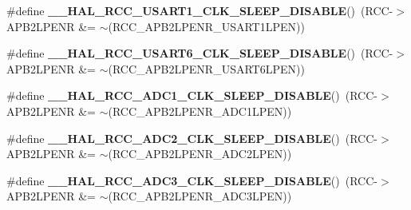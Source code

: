 \begin{DoxyCompactItemize}
\item 
\mbox{\label{group___r_c_c_ex___peripheral___clock___sleep___enable___disable_ga75ec6abe2e15eaa24893a8cc83f4cb50}} 
\#define {\bfseries \+\_\+\+\_\+\+H\+A\+L\+\_\+\+R\+C\+C\+\_\+\+U\+S\+A\+R\+T1\+\_\+\+C\+L\+K\+\_\+\+S\+L\+E\+E\+P\+\_\+\+D\+I\+S\+A\+B\+LE}()~(R\+CC-\/$>$A\+P\+B2\+L\+P\+E\+NR \&= $\sim$(R\+C\+C\+\_\+\+A\+P\+B2\+L\+P\+E\+N\+R\+\_\+\+U\+S\+A\+R\+T1\+L\+P\+EN))
\item 
\mbox{\label{group___r_c_c_ex___peripheral___clock___sleep___enable___disable_ga7df7a1b0a2e5d8b9318cf68de7665b3b}} 
\#define {\bfseries \+\_\+\+\_\+\+H\+A\+L\+\_\+\+R\+C\+C\+\_\+\+U\+S\+A\+R\+T6\+\_\+\+C\+L\+K\+\_\+\+S\+L\+E\+E\+P\+\_\+\+D\+I\+S\+A\+B\+LE}()~(R\+CC-\/$>$A\+P\+B2\+L\+P\+E\+NR \&= $\sim$(R\+C\+C\+\_\+\+A\+P\+B2\+L\+P\+E\+N\+R\+\_\+\+U\+S\+A\+R\+T6\+L\+P\+EN))
\item 
\mbox{\label{group___r_c_c_ex___peripheral___clock___sleep___enable___disable_ga9534ddc24145ef6335d76b35632b7fe2}} 
\#define {\bfseries \+\_\+\+\_\+\+H\+A\+L\+\_\+\+R\+C\+C\+\_\+\+A\+D\+C1\+\_\+\+C\+L\+K\+\_\+\+S\+L\+E\+E\+P\+\_\+\+D\+I\+S\+A\+B\+LE}()~(R\+CC-\/$>$A\+P\+B2\+L\+P\+E\+NR \&= $\sim$(R\+C\+C\+\_\+\+A\+P\+B2\+L\+P\+E\+N\+R\+\_\+\+A\+D\+C1\+L\+P\+EN))
\item 
\mbox{\label{group___r_c_c_ex___peripheral___clock___sleep___enable___disable_ga2ab85836860965c7c7292e9e5f930faf}} 
\#define {\bfseries \+\_\+\+\_\+\+H\+A\+L\+\_\+\+R\+C\+C\+\_\+\+A\+D\+C2\+\_\+\+C\+L\+K\+\_\+\+S\+L\+E\+E\+P\+\_\+\+D\+I\+S\+A\+B\+LE}()~(R\+CC-\/$>$A\+P\+B2\+L\+P\+E\+NR \&= $\sim$(R\+C\+C\+\_\+\+A\+P\+B2\+L\+P\+E\+N\+R\+\_\+\+A\+D\+C2\+L\+P\+EN))
\item 
\mbox{\label{group___r_c_c_ex___peripheral___clock___sleep___enable___disable_ga05450a8b04c1d2cdd122af78eeaad99a}} 
\#define {\bfseries \+\_\+\+\_\+\+H\+A\+L\+\_\+\+R\+C\+C\+\_\+\+A\+D\+C3\+\_\+\+C\+L\+K\+\_\+\+S\+L\+E\+E\+P\+\_\+\+D\+I\+S\+A\+B\+LE}()~(R\+CC-\/$>$A\+P\+B2\+L\+P\+E\+NR \&= $\sim$(R\+C\+C\+\_\+\+A\+P\+B2\+L\+P\+E\+N\+R\+\_\+\+A\+D\+C3\+L\+P\+EN))

\end{DoxyCompactItemize}
